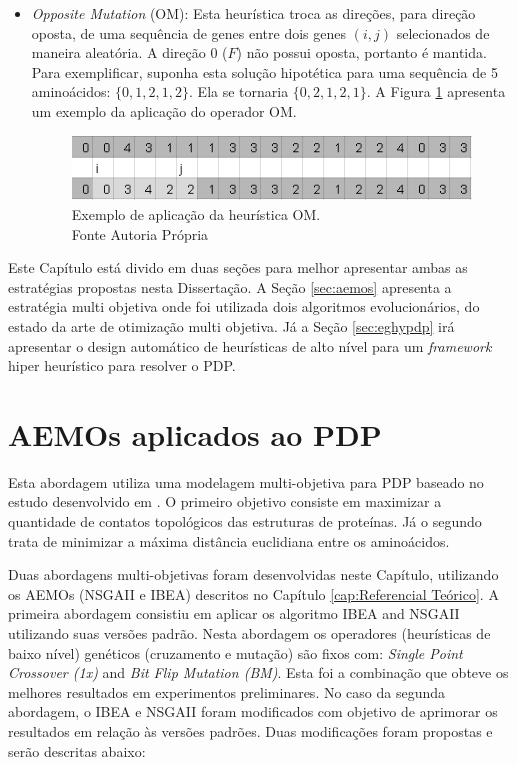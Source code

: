 \begin{itemize}
 	\item \textit{Opposite Mutation} (OM): Esta heurística troca as direções, para direção oposta, de uma sequência de genes entre dois genes $(i,j)$ selecionados de maneira aleatória. A direção 0 ($F$) não possui oposta, portanto é mantida. Para exemplificar, suponha esta solução hipotética para uma sequência de 5 aminoácidos: $\{0,1,2,1,2\}$. Ela se tornaria $\{0,2,1,2,1\}$. A Figura \ref{fig:oppositeMutation} apresenta um exemplo da aplicação do operador OM.
 	
 	
 	\begin{figure}[!htb]
 		\centering
 		\includegraphics{Imagens/OppositeMutation.png}
 		\caption{Exemplo de aplicação da heurística OM. \\Fonte Autoria Própria}
 		\label{fig:oppositeMutation}
 	\end{figure}
 	
 	
 	
 \end{itemize} 



 Este Capítulo está divido em duas seções para melhor apresentar ambas as estratégias propostas nesta Dissertação. A Seção \ref{sec:aemos} apresenta a estratégia multi objetiva onde foi utilizada dois algoritmos evolucionários, do estado da arte de otimização multi objetiva. Já a Seção  \ref{sec:eghypdp} irá apresentar o design automático de heurísticas de alto nível para um \textit{framework} hiper heurístico para resolver o PDP.

	



\section{AEMOs aplicados ao PDP}
\label{sec:aeoms}

Esta abordagem utiliza uma modelagem multi-objetiva para PDP baseado no estudo desenvolvido em \cite{gabriel2012algoritmos}. O primeiro objetivo consiste em maximizar a quantidade de contatos topológicos das estruturas de proteínas. Já o segundo  trata de minimizar a máxima distância euclidiana entre os aminoácidos. 

Duas abordagens multi-objetivas foram desenvolvidas neste Capítulo, utilizando os AEMOs (NSGAII e IBEA) descritos no Capítulo \ref{cap:Referencial Teórico}. A primeira abordagem consistiu em aplicar os algoritmo IBEA and NSGAII utilizando suas versões padrão. Nesta abordagem os operadores (heurísticas de baixo nível) genéticos (cruzamento e mutação) são fixos com: \textit{Single Point Crossover (1x)} and \textit{Bit Flip Mutation (BM)}. Esta foi a combinação que obteve os melhores resultados em experimentos preliminares. No caso da segunda abordagem, o IBEA e NSGAII foram modificados com objetivo de aprimorar os resultados em relação às versões padrões. Duas modificações foram propostas e serão descritas abaixo:

